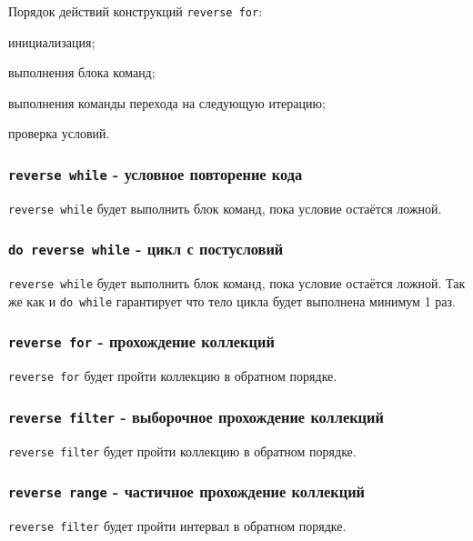 Порядок действий конструкций \lstinline|reverse for|:
\begin{icEnum}
	\item инициализация;
	\item выполнения блока команд;
	\item выполнения команды перехода на следующую итерацию;
	\item проверка условий.
\end{icEnum}

\subsubsection{\lstinline|reverse while| - условное повторение кода}

\lstinline|reverse while| будет выполнить блок команд, пока условие остаётся ложной.

\subsubsection{\lstinline|do reverse while| - цикл с постусловий}

\lstinline|reverse while| будет выполнить блок команд, пока условие остаётся ложной. Так же как и \lstinline|do while| гарантирует что тело цикла будет выполнена минимум 1 раз.

\subsubsection{\lstinline|reverse for| - прохождение коллекций}

\lstinline|reverse for| будет пройти коллекцию в обратном порядке.

\subsubsection{\lstinline|reverse filter| - выборочное прохождение коллекций}

\lstinline|reverse filter| будет пройти коллекцию в обратном порядке.

\subsubsection{\lstinline|reverse range| - частичное прохождение коллекций}

\lstinline|reverse filter| будет пройти интервал в обратном порядке.

